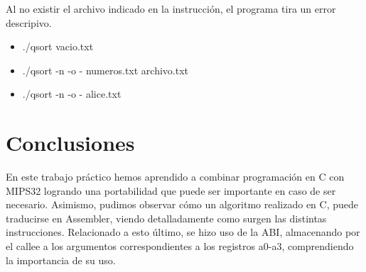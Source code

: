 \documentclass[a4paper,10pt]{article}
\numberwithin{equation}{section}
\numberwithin{figure}{section}
\begin{document}
Al no existir el archivo indicado en la instrucción, el programa tira un error descripivo.

\begin{itemize}
\item  ./qsort vacio.txt
\end{itemize}
\noindent{}

\begin{itemize}
\item  ./qsort -n -o - numeros.txt archivo.txt
\end{itemize}
\noindent{}

\begin{itemize}
\item  ./qsort -n -o - alice.txt
\end{itemize}
\noindent{}

\section{Conclusiones}

En este trabajo práctico hemos aprendido a combinar programación en C con MIPS32 logrando una portabilidad que puede ser importante en caso de ser necesario. Asimismo, pudimos observar cómo un algoritmo realizado en C, puede traducirse en Assembler, viendo detalladamente como surgen las distintas instrucciones. Relacionado a esto último, se hizo uso de la ABI, almacenando por el callee a los argumentos correspondientes a los registros a0-a3, comprendiendo la importancia de su uso.
\end{document}
